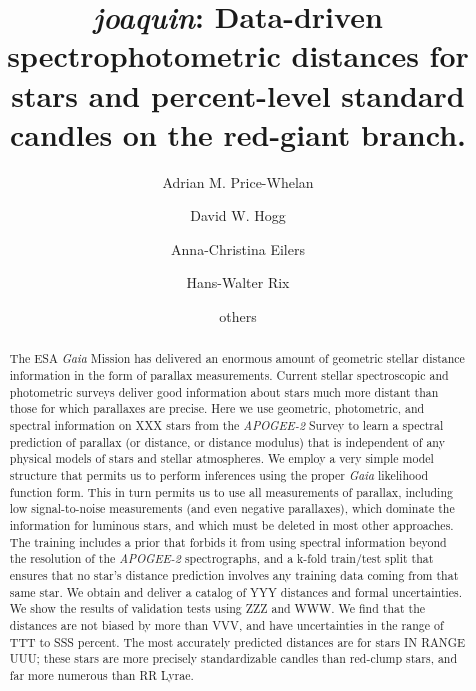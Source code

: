 \documentclass[modern]{aastex631}
\newcommand{\acronym}[1]{{\small{#1}}}
\newcommand{\project}[1]{\textsl{#1}}
\newcommand{\joaquin}{\project{joaquin}}
\newcommand{\ESA}{\acronym{ESA}}
\newcommand{\Gaia}{\project{Gaia}}
\newcommand{\APOGEE}{\project{\acronym{APOGEE-2}}}
\begin{document}
\title{\joaquin{}: Data-driven spectrophotometric distances for stars and
  percent-level standard candles on the red-giant branch.}

\author{Adrian M. Price-Whelan}

\author[0000-0003-2866-9403]{David W. Hogg}

\author{Anna-Christina Eilers}

\author{Hans-Walter Rix}

\author{others}

\begin{abstract}\noindent
The \ESA{} \Gaia{} Mission has delivered an enormous amount of geometric stellar distance information in the form of parallax measurements.
Current stellar spectroscopic and photometric surveys deliver
good information about stars much more distant than those for which
parallaxes are precise.
Here we use geometric, photometric, and spectral information on XXX
stars from the \APOGEE{} Survey to learn a spectral prediction of
parallax (or distance, or distance modulus) that is independent of
any physical models of stars and stellar atmospheres.
We employ a very simple model structure that permits us to perform
inferences using the proper \Gaia{} likelihood function form.
This in turn permits us to use all measurements of parallax, including
low signal-to-noise measurements (and even negative parallaxes), which
dominate the information for luminous stars, and which must be deleted
in most other approaches.
The training includes a prior that forbids it from using spectral
information beyond the resolution of the \APOGEE{} spectrographs,
and a k-fold train/test split that ensures that no star's distance prediction
involves any training data coming from that same star.
We obtain and deliver a catalog of YYY distances and formal uncertainties.
We show the results of validation tests using ZZZ and WWW.
We find that the distances are not biased by more than VVV, and have uncertainties
in the range of TTT to SSS percent.
The most accurately predicted distances are for stars IN RANGE UUU; these stars
are more precisely standardizable candles than red-clump stars, and far more numerous
than RR Lyrae.
\end{abstract}
\end{document}

